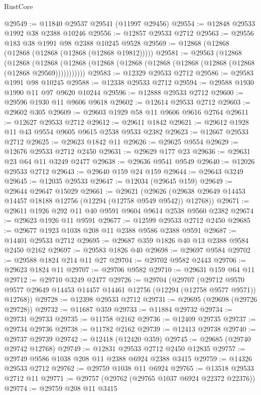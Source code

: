 \begin{lexlean}{RustCore}
\begin{coremodule}
@29549 := @11840 @29537 @29541 (@11997 @29456)
@29554 := @12848 @29533 @1992 @38 @2388 @10246
@29556 := @12857 @29533 @2712
@29563 := @29556 @183 @38 @1991 @98 @2388 @10245 @9528
@29569 := @12868 (@12868 (@12868 (@12868 (@12868 (@12868 @19812)))))
@29581 := @29563
    (@12868
      (@12868
        (@12868 (@12868 (@12868 (@12868 (@12868 (@12868 (@12868 (@12868 (@12868 @29569)))))))))))
@29583 := @12329 @29533 @2712
@29586 := @29583 @1991 @98 @10245
@29588 := @12338 @29533 @2712
@29594 := @29588 @1930 @1990 @11 @97 @9620 @10244
@29596 := @12888 @29533 @2712
@29600 := @29596 @1930 @11 @9606 @9618
@29602 := @12614 @29533 @2712
@29603 := @29602 @305
@29609 := @29603 @1929 @58 @11 @9606 @9616 @2764
@29611 := @12627 @29533 @2712
@29612 := @29611 @1842
@29621 := @29612 @1928 @11 @43 @9554 @9605 @9615 @2538 @9533 @2382
@29623 := @12667 @29533 @2712
@29625 := @29623 @1842 @11
@29626 := @29625 @9554
@29629 := @12676 @29533 @2712 @2450
@29631 := @29629 @177 @23
@29636 := @29631 @23 @64 @11 @3249 @2477
@29638 := @29636 @9541 @9549
@29640 := @12026 @29533 @2712
@29643 := @29640 @159 @24 @159
@29644 := @29643 @3249
@29645 := @12035 @29533
@29647 := @12034 (@29645 @159)
@29649 := @29644 @29647 @15029
@29661 := @29621
    (@29626 (@29638 @29649 @14453 @14457 @18188 @12756 (@12294 (@12758 @9549 @9542)) @12768))
@29671 := @29611 @1926 @292 @11 @40 @9591 @9604 @9614 @2538 @9560 @2382
@29674 := @29623 @1926 @11 @9591
@29677 := @12599 @29533 @2712 @2450
@29685 := @29677 @1923 @1038 @208 @11 @2388 @9586 @2388 @9591
@29687 := @14401 @29533 @2712
@29695 := @29687 @359 @1826 @40 @13 @2388 @9584 @2450 @2162
@29697 := @29583 @1826 @40
@29698 := @29697 @9584
@29702 := @29588 @1824 @214 @11 @27
@29704 := @29702 @9582 @2443
@29706 := @29623 @1824 @11
@29707 := @29706 @9582
@29710 := @29631 @159 @64 @11
@29712 := @29710 @3249 @2477
@29726 := @29704
    (@29707
      (@29712 @9570 @9577 @29649 @14453 @14457 @14461 @12756 (@12294 (@12758 @9577 @9571)) @12768))
@29728 := @12398 @29533 @2712
@29731 := @29695 (@29698 (@29726 @29728))
@29732 := @11687 @359
@29733 := @11884 @29732
@29734 := @29731 @29733
@29735 := @11758 @2162
@29736 := @12409 @29735
@29737 := @29734 @29736
@29738 := @11782 @2162
@29739 := @12413 @29738
@29740 := @29737 @29739
@29742 := @12418 (@12420 @359)
@29745 := @29685 (@29740 @29742 @12768)
@29749 := @12831 @29533 @2712 @2450 @12835
@29757 := @29749 @9586 @1038 @208 @11 @2388 @6924 @2388 @3415
@29759 := @14326 @29533 @2712
@29762 := @29759 @1038 @11 @6924
@29765 := @13518 @29533 @2712 @11
@29771 := @29757 (@29762 (@29765 @1037 @6924 @22372 @22376))
@29774 := @29759 @208 @11 @3415

\end{coremodule}
\end{lexlean}
